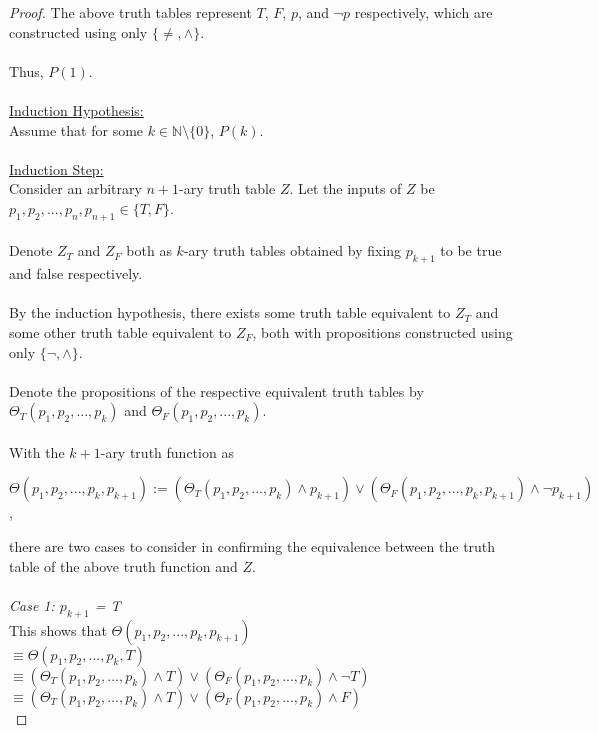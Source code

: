 \documentclass[12pt]{article}
\begin{document}
\begin{proof}
    The above truth tables represent $T$, $F$, $p$, and $\neg p$ respectively, which are constructed using only $\{\neq, \land\}$. \\
    \\
    Thus, $P(1)$. \\
    \\
    \underline{Induction Hypothesis:} \\
    Assume that for some $k \in \mathbb{N}\setminus\{0\}$, $P(k)$. \\
    \\
    \underline{Induction Step:} \\
    Consider an arbitrary $n+1$-ary truth table $Z$. Let the inputs of $Z$ be $p_1, p_2, ..., p_n, p_{n+1} \in \{T, F\}$. \\
    \\
    Denote $Z_T$ and $Z_F$ both as $k$-ary truth tables obtained by fixing $p_{k+1}$ to be true and false respectively. \\
    \\
    By the induction hypothesis, there exists some truth table equivalent to $Z_T$ and some other truth table equivalent to $Z_F$, both with propositions constructed using only $\{\neg, \land\}$. \\
    \\
    Denote the propositions of the respective equivalent truth tables by $\Theta_T(p_1, p_2, ..., p_k)$ and $\Theta_F(p_1, p_2, ..., p_k)$. \\
    \\
    With the $k+1$-ary truth function as
    \begin{center}
        $\Theta(p_1, p_2, ..., p_k, p_{k+1}) := (\Theta_T(p_1, p_2, ..., p_k) \land p_{k+1}) \lor (\Theta_F(p_1, p_2, ..., p_k, p_{k+1}) \land \neg p_{k+1})$,
    \end{center}
    there are two cases to consider in confirming the equivalence between the truth table of the above truth function and $Z$. \\
    \\
    \textit{Case 1: $p_{k+1}$ = T} \\
    This shows that $\Theta(p_1, p_2, ..., p_k, p_{k+1})$ \\
    $\equiv \Theta(p_1, p_2, ..., p_k, T)$ \\
    $\equiv (\Theta_T(p_1, p_2, ..., p_k) \land T) \lor (\Theta_F(p_1, p_2, ..., p_k) \land \neg T)$ \\
    $\equiv (\Theta_T(p_1, p_2, ..., p_k) \land T) \lor (\Theta_F(p_1, p_2, ..., p_k) \land F)$ \\

\end{proof}
\end{document}
